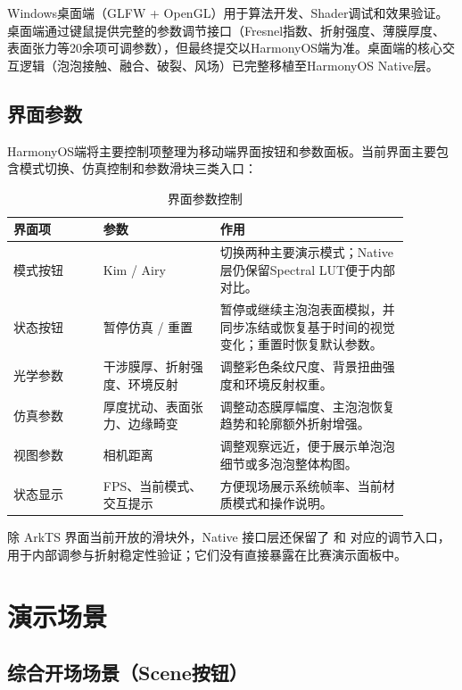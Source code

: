 Windows桌面端（GLFW + OpenGL）用于算法开发、Shader调试和效果验证。桌面端通过键鼠提供完整的参数调节接口（Fresnel指数、折射强度、薄膜厚度、表面张力等20余项可调参数），但最终提交以HarmonyOS端为准。桌面端的核心交互逻辑（泡泡接触、融合、破裂、风场）已完整移植至HarmonyOS Native层。

\subsection{界面参数}

HarmonyOS端将主要控制项整理为移动端界面按钮和参数面板。当前界面主要包含模式切换、仿真控制和参数滑块三类入口：

\begin{table}[H]
  \centering
  \caption{界面参数控制}
  \begin{tabular}{p{0.20\linewidth}p{0.26\linewidth}p{0.42\linewidth}}
    \toprule
    界面项 & 参数 & 作用 \\
    \midrule
    模式按钮 & Kim / Airy & 切换两种主要演示模式；Native层仍保留Spectral LUT便于内部对比。\\
    状态按钮 & 暂停仿真 / 重置 & 暂停或继续主泡泡表面模拟，并同步冻结或恢复基于时间的视觉变化；重置时恢复默认参数。\\
    光学参数 & 干涉膜厚、折射强度、环境反射 & 调整彩色条纹尺度、背景扭曲强度和环境反射权重。\\
    仿真参数 & 厚度扰动、表面张力、边缘畸变 & 调整动态膜厚幅度、主泡泡恢复趋势和轮廓额外折射增强。\\
    视图参数 & 相机距离 & 调整观察远近，便于展示单泡泡细节或多泡泡整体构图。\\
    状态显示 & FPS、当前模式、交互提示 & 方便现场展示系统帧率、当前材质模式和操作说明。\\
    \bottomrule
  \end{tabular}
\end{table}

除 ArkTS 界面当前开放的滑块外，Native 接口层还保留了  和  对应的调节入口，用于内部调参与折射稳定性验证；它们没有直接暴露在比赛演示面板中。

\section{演示场景}

\subsection{综合开场场景（Scene按钮）}

